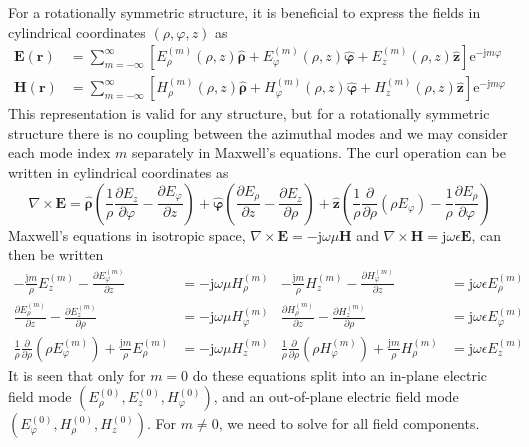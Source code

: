 \documentclass[a4paper,12pt]{article}
\renewcommand{\vec}[1]{\boldsymbol{#1}}
\newcommand{\unitvec}[1]{\hat{\vec{#1}}}
\newcommand{\mrm}[1]{\mathrm{#1}}
\newcommand{\ju}{\mrm{j}}
\newcommand{\eu}{\mrm{e}}
\newcommand{\Ev}{\vec{E}}
\newcommand{\Hv}{\vec{H}}
\newcommand{\rv}{\vec{r}}
\newcommand{\zuv}{\unitvec{z}}
\newcommand{\rhouv}{\unitvec{\rho}}
\newcommand{\varphiuv}{\unitvec{\varphi}}
\begin{document}
For a rotationally symmetric structure, it is beneficial to express
the fields in cylindrical coordinates $(\rho,\varphi,z)$ as
\begin{align}
  \Ev(\rv) &= \sum_{m=-\infty}^{\infty} \left[E_{\rho}^{(m)}(\rho,z)\rhouv + E_{\varphi}^{(m)}(\rho,z)\varphiuv + E_{z}^{(m)}(\rho,z)\zuv \right] \eu^{-\ju m\varphi} \\
  \Hv(\rv) &= \sum_{m=-\infty}^{\infty} \left[H_{\rho}^{(m)}(\rho,z)\rhouv + H_{\varphi}^{(m)}(\rho,z)\varphiuv + H_{z}^{(m)}(\rho,z)\zuv \right] \eu^{-\ju m\varphi}
\end{align}
This representation is valid for any structure, but for a rotationally
symmetric structure there is no coupling between the azimuthal modes
and we may consider each mode index $m$ separately in Maxwell's
equations. The curl operation can be written in cylindrical
coordinates as
\begin{equation}
  \nabla\times\Ev = \rhouv\left(\frac{1}{\rho}\frac{\partial E_{z}}{\partial\varphi} - \frac{\partial E_{\varphi}}{\partial z}\right) + \varphiuv\left(\frac{\partial E_{\rho}}{\partial z} - \frac{\partial E_{z}}{\partial\rho}\right) + \zuv\left( \frac{1}{\rho}\frac{\partial}{\partial\rho}(\rho E_{\varphi}) - \frac{1}{\rho}\frac{\partial E_{\rho}}{\partial\varphi}\right)
\end{equation}
Maxwell's equations in isotropic space, $\nabla\times\Ev =
-\ju\omega\mu\Hv$ and $\nabla\times\Hv =
\ju\omega\epsilon\Ev$, can then be written
\begin{align}
  -\frac{\ju m}{\rho}E_{z}^{(m)} - \frac{\partial E_{\varphi}^{(m)}}{\partial z} &= -\ju\omega\mu H_{\rho}^{(m)} & 
  -\frac{\ju m}{\rho}H_{z}^{(m)} - \frac{\partial H_{\varphi}^{(m)}}{\partial z} &= \ju\omega\epsilon E_{\rho}^{(m)} \label{eq:Maxwellrho} \\
  \frac{\partial E_{\rho}^{(m)}}{\partial z} - \frac{\partial E_{z}^{(m)}}{\partial\rho} &= -\ju\omega\mu H_{\varphi}^{(m)} & 
  \frac{\partial H_{\rho}^{(m)}}{\partial z} - \frac{\partial H_{z}^{(m)}}{\partial\rho} &= \ju\omega\epsilon E_{\varphi}^{(m)} \label{eq:Maxwellvarphi} \\
  \frac{1}{\rho}\frac{\partial}{\partial\rho}(\rho E_{\varphi}^{(m)}) + \frac{\ju m}{\rho}E_{\rho}^{(m)} &= -\ju\omega\mu H_{z}^{(m)} &
  \frac{1}{\rho}\frac{\partial}{\partial\rho}(\rho H_{\varphi}^{(m)}) + \frac{\ju m}{\rho}H_{\rho}^{(m)} &= \ju\omega\epsilon E_{z}^{(m)} \label{eq:Maxwellz}
\end{align}
It is seen that only for $m=0$ do these equations split into an
in-plane electric field mode
$(E_{\rho}^{(0)},E_{z}^{(0)},H_{\varphi}^{(0)})$, and an out-of-plane
electric field mode
$(E_{\varphi}^{(0)},H_{\rho}^{(0)},H_{z}^{(0)})$. For $m\neq0$, we
need to solve for all field components.
\end{document}

